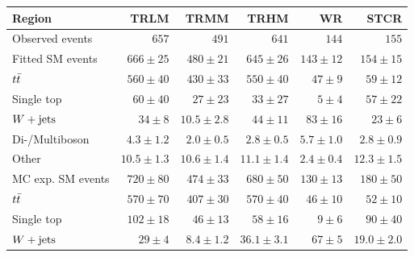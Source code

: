 

\begin{table}
\begin{center}
{\small
\begin{tabular}{lrrrrr}
\toprule
Region           & TRLM            & TRMM            & TRHM            & WR            & STCR              \\[-0.05cm]
\midrule
Observed events          & $657$              & $491$              & $641$              & $144$              & $155$                    \\
\midrule
Fitted SM events         & $666 \pm 25$          & $480 \pm 21$          & $645 \pm 26$          & $143 \pm 12$          & $154 \pm 15$              \\
\noalign{\smallskip}\hline\noalign{\smallskip}
        $t\bar{t}$         & $560 \pm 40$          & $430 \pm 33$          & $550 \pm 40$          & $47 \pm 9$          & $59 \pm 12$              \\
        Single top         & $60 \pm 40$          & $27 \pm 23$          & $33 \pm 27$          & $5 \pm 4$          & $57 \pm 22$              \\
        $W+\mathrm{jets}$         & $34 \pm 8$          & $10.5 \pm 2.8$          & $44 \pm 11$          & $83 \pm 16$          & $23 \pm 6$              \\
        Di-/Multiboson        & $4.3 \pm 1.2$          & $2.0 \pm 0.5$          & $2.8 \pm 0.5$          & $5.7 \pm 1.0$          & $2.8 \pm 0.9$              \\
        Other       & $10.5 \pm 1.3$          & $10.6 \pm 1.4$          & $11.1 \pm 1.4$          & $2.4 \pm 0.4$          & $12.3 \pm 1.5$              \\
\toprule
MC exp. SM events              & $720 \pm 80$          & $474 \pm 33$          & $680 \pm 50$          & $130 \pm 13$          & $180 \pm 50$              \\
\midrule
        $t\bar{t}$        & $570 \pm 70$          & $407 \pm 30$          & $570 \pm 40$          & $46 \pm 10$          & $52 \pm 10$              \\
        Single top         & $102 \pm 18$          & $46 \pm 13$          & $58 \pm 16$          & $9 \pm 6$          & $90 \pm 40$              \\
        $W+\mathrm{jets}$         & $29 \pm 4$          & $8.4 \pm 1.2$          & $36.1 \pm 3.1$          & $67 \pm 5$          & $19.0 \pm 2.0$              \\

\end{tabular}}
\end{center}
\end{table}
